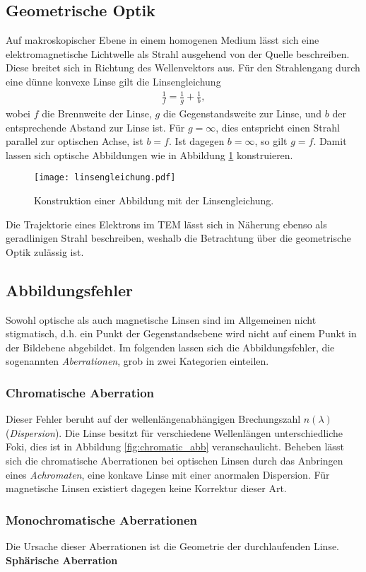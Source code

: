 \subsection{Geometrische Optik}
Auf makroskopischer Ebene in einem homogenen Medium lässt sich eine elektromagnetische Lichtwelle als Strahl ausgehend von der Quelle beschreiben. Diese breitet sich in Richtung des Wellenvektors aus. Für den Strahlengang durch eine dünne konvexe Linse gilt die Linsengleichung
\begin{align}
\frac{1}{f}=\frac{1}{g}+\frac{1}{b},
\label{eq:abb_gleichung}
\end{align}
wobei $f$ die Brennweite der Linse, $g$ die Gegenstandsweite zur Linse, und $b$ der entsprechende Abstand zur Linse ist. Für $g=\infty$, dies entspricht einen Strahl parallel zur optischen Achse, ist $b=f$. Ist dagegen $b=\infty$, so gilt $g=f$. Damit lassen sich optische Abbildungen wie in Abbildung \ref{fig:geo_optik} konstruieren.
\begin{figure}[h]
	\centering
	\texttt{[image: linsengleichung.pdf]}
	\caption{Konstruktion einer Abbildung mit der Linsengleichung.}
	\label{fig:geo_optik}
\end{figure}
Die Trajektorie eines Elektrons im TEM lässt sich in Näherung ebenso als geradlinigen Strahl beschreiben, weshalb die Betrachtung über die geometrische Optik zulässig ist.
\subsection{Abbildungsfehler}
Sowohl optische als auch magnetische Linsen sind im Allgemeinen nicht stigmatisch, d.h. ein Punkt der Gegenstandsebene wird nicht auf einem Punkt in der Bildebene abgebildet. Im folgenden lassen sich die Abbildungsfehler, die sogenannten \emph{Aberrationen}, grob in zwei Kategorien einteilen.
\subsubsection{Chromatische Aberration}
Dieser Fehler beruht auf der wellenlängenabhängigen Brechungszahl $n(\lambda)$ (\emph{Dispersion}). Die Linse besitzt für verschiedene Wellenlängen unterschiedliche Foki, dies ist in Abbildung \ref{fig:chromatic_abb} veranschaulicht.
Beheben lässt sich die chromatische Aberrationen bei optischen Linsen durch das Anbringen eines \emph{Achromaten}, eine konkave Linse mit einer anormalen Dispersion. Für magnetische Linsen existiert dagegen keine Korrektur dieser Art.
\subsubsection{Monochromatische Aberrationen}
Die Ursache dieser Aberrationen ist die Geometrie der durchlaufenden Linse.\\
\newline
\textbf{Sphärische Aberration}

